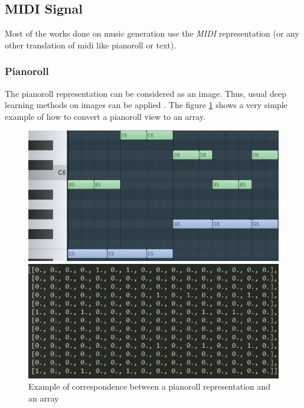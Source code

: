\documentclass[12pt]{report}
\begin{document}
\subsection{MIDI Signal}

Most of the works done on music generation use the \textit{MIDI} representation (or any other translation of midi like pianoroll or text). \cite{chuan_modeling_nodate, hadjeres_deepbach:_2016, huang_counterpoint_2017, liang_automatic_2017, adiloglu_machine_2007, herremans_composing_2013, herremans_modeling_2017, boulanger-lewandowski_modeling_2012, lattner_imposing_2018, colombo_learning_2019, brunner_symbolic_2018, wu_hierarchical_2018}

\subsubsection{Pianoroll}
\label{sec:rw:pianoroll}

The pianoroll representation can be considered as an image.
Thus, usual deep learning methods on images can  be applied \cite{huang_counterpoint_2017, chuan_modeling_nodate, boulanger-lewandowski_modeling_2012, lattner_imposing_2018, donahue_adversarial_2019}.
The figure \ref{fig:pianoroll_to_array} shows a very simple example of how to convert a pianoroll view to an array.

\begin{figure}[H]
   \begin{minipage}{0.5\textwidth}
     \centering
     \includegraphics[width=.9\linewidth]{images/music/pianoroll/pianoroll_small.jpg}
   \end{minipage}\hfill
   \begin{minipage}{0.5\textwidth}
     \centering
     \includegraphics[width=\linewidth]{images/music/pianoroll/pianoroll_small_array.jpg}
   \end{minipage}
 \caption{Example of correspondence between a pianoroll representation and an array}
 \label{fig:pianoroll_to_array}
\end{figure}
\end{document}
